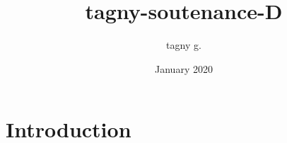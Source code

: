 \documentclass{article}
\title{tagny-soutenance-D}
\author{tagny g.}
\date{January 2020}
\begin{document}
\maketitle

\section{Introduction}
\end{document}
